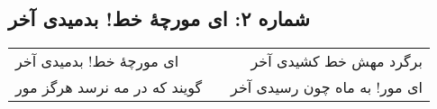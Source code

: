 \begin{center}
\section*{شماره ۲: ای مورچۀ خط! بدمیدی آخر}
\label{sec:002}
\begin{longtable}{l p{0.5cm} r}
ای مورچهٔ خط! بدمیدی آخر
&&
برگرد مهش خط کشیدی آخر
\\
گویند که در مه نرسد هرگز مور
&&
ای مور! به ماه چون رسیدی آخر
\\
\end{longtable}
\end{center}
